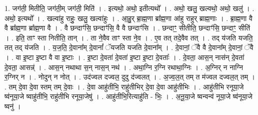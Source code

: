 \documentclass[17pt]{extarticle}
\begin{document}
1. जग॑ती॒ मितीति॒ जग॑ती॒म् जग॑ती॒ मिति॑ । . इत्यथो॒ अथो॒ इतीत्यथो᳚ । . अथो॒ खलु॒ खल्वथो॒ अथो॒ खलु॑ । . अथो॒ इत्यथो᳚ । . खल्वा॑हु राहुः॒ खलु॒ खल्वा॑हुः । . आ॒हु॒र् ब्रा॒ह्म॒णा ब्रा᳚ह्म॒णा आ॑हु राहुर् ब्राह्म॒णाः । . ब्रा॒ह्म॒णा वै वै ब्रा᳚ह्म॒णा ब्रा᳚ह्म॒णा वै । . वै छन्दाꣳ॑सि॒ छन्दाꣳ॑सि॒ वै वै छन्दाꣳ॑सि । . छन्दाꣳ॒॒ सीतीति॒ छन्दाꣳ॑सि॒ छन्दाꣳ॒॒ सीति॑ । . इति॒ ताꣳ स्ता नितीति॒ तान् । . ता ने॒वैव ताꣳ स्ता ने॒व । . ए॒व तत् तदे॒वैव तत् । . तद् य॑जति यजति॒ तत् तद् य॑जति । . य॒ज॒ति॒ दे॒वाना᳚म् दे॒वानां᳚ ॅयजति यजति दे॒वाना᳚म् । . दे॒वानां॒ ॅवै वै दे॒वाना᳚म् दे॒वानां॒ ॅवै । . वा इ॒ष्टा इ॒ष्टा वै वा इ॒ष्टाः । . इ॒ष्टा दे॒वता॑ दे॒वता॑ इ॒ष्टा इ॒ष्टा दे॒वताः᳚ । . दे॒वता॒ आस॒न् नास॑न् दे॒वता॑ दे॒वता॒ आसन्न्॑ । . आस॒न् नथाथा स॒न् नास॒न् नथ॑ । . अथा॒ग्नि र॒ग्नि रथाथा॒ग्निः । . अ॒ग्निर् न नाग्नि र॒ग्निर् न । . नोदुन् न नोत् । . उद॑ज्वल दज्वल॒ दुदु द॑ज्वलत् । . अ॒ज्व॒ल॒त् तम् त म॑ज्वल दज्वल॒त् तम् । . तम् दे॒वा दे॒वा स्तम् तम् दे॒वाः । . दे॒वा आहु॑तीभि॒ राहु॑तीभिर् दे॒वा दे॒वा आहु॑तीभिः । . आहु॑तीभि रनूया॒जे ष्व॑नूया॒जे ष्वाहु॑तीभि॒ राहु॑तीभि रनूया॒जेषु॑ । . आहु॑तीभि॒रित्याहु॑ति - भिः॒ । . अ॒नू॒या॒जे ष्वन्वन्व॑ नूया॒जे ष्व॑नूया॒जे ष्वनु॑ । \newline
\end{document}
